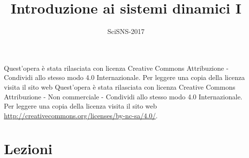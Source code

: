 \documentclass[a4paper]{scrbook}
\title{Introduzione ai sistemi dinamici I}
\author{SciSNS-2017}
\newif\iffigureon
\theoremstyle{definition}
\theoremstyle{remark}
\theoremstyle{plain}
\numberwithin{equation}{chapter}
\begin{document}
	
\frontmatter

\maketitle

Quest'opera è stata rilasciata con licenza Creative Commons Attribuzione - Condividi allo stesso modo 4.0 Internazionale. Per leggere una copia della licenza visita il sito web Quest'opera è stata rilasciata con licenza Creative Commons Attribuzione - Non commerciale - Condividi allo stesso modo 4.0 Internazionale. Per leggere una copia della licenza visita il sito web \url{http://creativecommons.org/licenses/by-nc-sa/4.0/}.
\iffigureon
\begin{center}
	\href{http://creativecommons.org/licenses/by-nc-sa/4.0/}{\texttt{[image: img/by-nc-sa]}}
\end{center}
\fi	


\tableofcontents


\mainmatter

\chapter{Lezioni}









\backmatter

%
\end{document}
